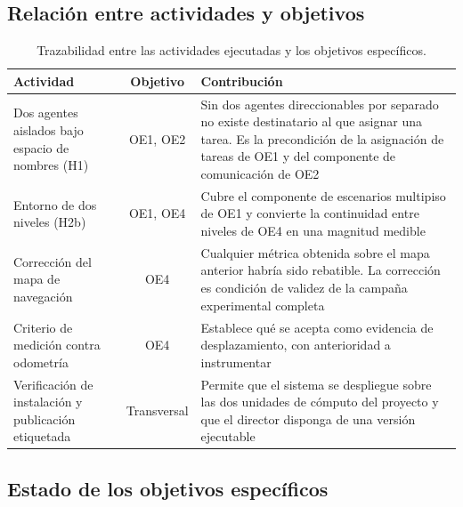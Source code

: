 \documentclass[12pt,letterpaper]{article}
\begin{document}
\subsection{Relación entre actividades y objetivos}

\begin{table}[H]
    \centering
    \small
    \caption{Trazabilidad entre las actividades ejecutadas y los objetivos específicos.}
    \label{tab:trazabilidad}
    \begin{tabular}{@{}p{4.0cm}cp{7.6cm}@{}}
        \toprule
        \textbf{Actividad} & \textbf{Objetivo} & \textbf{Contribución} \\ \midrule
        Dos agentes aislados bajo espacio de nombres (H1) & OE1, OE2 & Sin dos agentes direccionables por separado no existe destinatario al que asignar una tarea. Es la precondición de la asignación de tareas de OE1 y del componente de comunicación de OE2 \\ \addlinespace
        Entorno de dos niveles (H2b) & OE1, OE4 & Cubre el componente de escenarios multipiso de OE1 y convierte la continuidad entre niveles de OE4 en una magnitud medible \\ \addlinespace
        Corrección del mapa de navegación & OE4 & Cualquier métrica obtenida sobre el mapa anterior habría sido rebatible. La corrección es condición de validez de la campaña experimental completa \\ \addlinespace
        Criterio de medición contra odometría & OE4 & Establece qué se acepta como evidencia de desplazamiento, con anterioridad a instrumentar \\ \addlinespace
        Verificación de instalación y publicación etiquetada & Transversal & Permite que el sistema se despliegue sobre las dos unidades de cómputo del proyecto y que el director disponga de una versión ejecutable \\ \bottomrule
    \end{tabular}
\end{table}

\subsection{Estado de los objetivos específicos}
\end{document}

